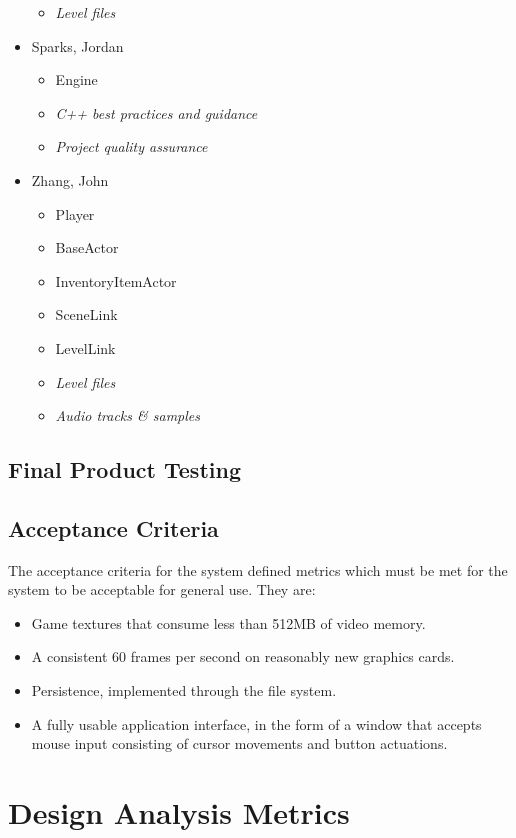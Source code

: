 \documentclass{article}
\begin{document}
\begin{multicols}{2}
\begin{itemize}
\begin{itemize}
				\item \emph{Level files}
			\end{itemize}
        \item Sparks, Jordan 
        	\begin{itemize}
				\item Engine
				\item \emph{C++ best practices and guidance} 
				\item \emph{Project quality assurance}
			\end{itemize}
        \item Zhang, John 
        	\begin{itemize}
				\item Player
				\item BaseActor
				\item InventoryItemActor
				\item SceneLink
				\item LevelLink
				\item \emph{Level files}
				\item \emph{Audio tracks \& samples}
			\end{itemize}
      \end{itemize}
      \end{multicols}
      
	\subsection{Final Product Testing}
	\subsection{Acceptance Criteria}
		The acceptance criteria for the system defined metrics which must be met for the system to be acceptable for general use. They are:
		\begin{itemize}
			\item Game textures that consume less than 512MB of video memory.
      \item A consistent 60 frames per second on reasonably new graphics cards.
			\item Persistence, implemented through the file system. 
			\item A fully usable application interface, in the form of a window that accepts mouse input consisting of cursor movements and button actuations.
		\end{itemize}
%
%
\section{Design Analysis Metrics}
\end{document}
